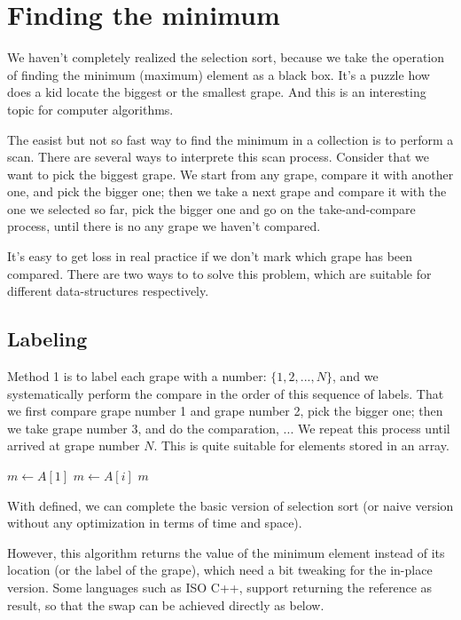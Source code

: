 \documentclass{article}
\begin{document}
\section{Finding the minimum}

We haven't completely realized the selection sort, because we take the operation
of finding the minimum (maximum) element as a black box. It's a puzzle how does
a kid locate the biggest or the smallest grape. 
And this is an interesting topic for computer algorithms.

The easist but not so fast way to find the minimum in a collection is to perform
a scan. There are several ways to interprete this scan process. Consider that
we want to pick the biggest grape. We start from any grape, compare it with 
another one, and pick the bigger one; then we take a next grape and compare
it with the one we selected so far, pick the bigger one and go on the take-and-compare
process, until there is no any grape we haven't compared.

It's easy to get loss in real practice if we don't mark which grape has been 
compared. There are two ways to to solve this problem, which are suitable for
different data-structures respectively.

\subsection{Labeling}
Method 1 is to label each grape with a number: $\{1, 2, ..., N\}$, and we systematically
perform the compare in the order of this sequence of labels. That we first 
compare grape number 1 and grape number 2, pick the bigger one; then we take grape
number 3, and do the comparation, ... We repeat this process until arrived at
grape number $N$. This is quite suitable for elements stored in an array.

\begin{algorithmic}
  \State $m \gets A[1]$
      \State $m \gets A[i]$
    \EndIf
  \EndFor
  \State \Return $m$
\EndFunction
\end{algorithmic}

With  defined, we can complete the basic version of selection sort
(or naive version without any optimization in terms of time and space). 

However, this algorithm returns the value of the minimum element instead of its
location (or the label of the grape), which need a bit tweaking for the in-place version.
Some languages such as ISO C++, support returning the reference as result, so that the
swap can be achieved directly as below.
\end{document}
